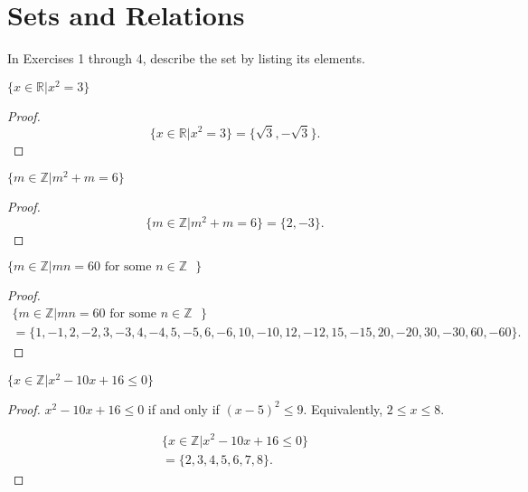 \section{Sets and Relations}

In Exercises 1 through 4, describe the set by listing its elements.

\begin{exercise}
    $\{ x\in\mathbb{R} \vert x^{2} = 3 \}$
\end{exercise}

\begin{proof}
    \[
        \{ x\in\mathbb{R} \vert x^{2} = 3 \} = \{ \sqrt{3}, -\sqrt{3} \}.
    \]
\end{proof}

\begin{exercise}
    $\{ m\in\mathbb{Z} \vert m^{2} + m = 6 \}$
\end{exercise}

\begin{proof}
    \[
        \{ m\in\mathbb{Z} \vert m^{2} + m = 6 \} = \{ 2, -3 \}.
    \]
\end{proof}

\begin{exercise}
    $\{ m\in\mathbb{Z} \vert mn = 60 \text{ for some $n\in\mathbb{Z}$ } \}$
\end{exercise}

\begin{proof}
    \begin{multline*}
        \{ m\in\mathbb{Z} \vert mn = 60 \text{\ for some $n\in\mathbb{Z}$ } \} \\
        = \{ 1, -1, 2, -2, 3, -3, 4, -4, 5, -5, 6, -6, 10, -10, 12, -12, 15, -15, 20, -20, 30, -30, 60, -60 \}.
    \end{multline*}
\end{proof}

\begin{exercise}
    $\{ x\in\mathbb{Z} \vert x^{2} - 10x + 16 \le 0 \}$
\end{exercise}

\begin{proof}
    $x^{2} - 10x + 16 \le 0$ if and only if ${(x - 5)}^{2} \le 9$. Equivalently, $2 \le x \le 8$.

    \begin{multline*}
        \{ x\in\mathbb{Z} \vert x^{2} - 10x + 16 \le 0 \} \\
        = \{ 2, 3, 4, 5, 6, 7, 8 \}.
    \end{multline*}
\end{proof}

